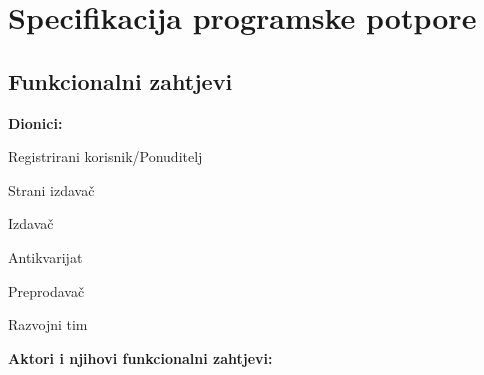 \chapter{Specifikacija programske potpore}
		
	\section{Funkcionalni zahtjevi}
			
			\noindent \textbf{Dionici:}
			
			\begin{packed_enum}
				
				\item Registrirani korisnik/Ponuditelj		
				\item Strani izdavač
                \item Izdavač
                \item Antikvarijat
                \item Preprodavač
                \item Razvojni tim
    
			\end{packed_enum}
			
			\noindent \textbf{Aktori i njihovi funkcionalni zahtjevi:}
			
